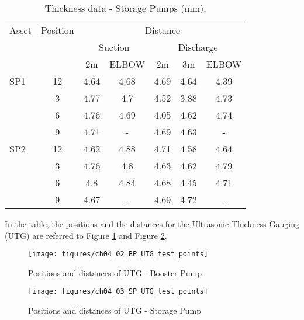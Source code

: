 \begin{table}[h]
	\caption{Thickness data - Storage Pumps (mm).}
	\label{ch04_tbl_thickness03}
	{\footnotesize
\begin{tabular}{l|c|c|c|c|l|l}
	\hline
	Asset & Position & \multicolumn{5}{c}{Distance} \\ 
	\cline{3-7}
	&  & \multicolumn{2}{c|}{Suction} & \multicolumn{3}{c}{Discharge} \\ 
	\cline{3-7}
	&  & 2m & ELBOW & 2m & \multicolumn{1}{c|}{3m} & \multicolumn{1}{c}{ELBOW} \\ 
	\hline
	SP1 & 12 & 4.64 & 4.68 & 4.69 & \multicolumn{1}{c|}{4.64} & \multicolumn{1}{c}{4.39} \\ 
	& 3 & 4.77 & 4.7 & 4.52 & \multicolumn{1}{c|}{3.88} & \multicolumn{1}{c}{4.73} \\ 
	& 6 & 4.76 & 4.69 & 4.05 & \multicolumn{1}{c|}{4.62} & \multicolumn{1}{c}{4.74} \\ 
	& 9 & 4.71 & - & 4.69 & \multicolumn{1}{c|}{4.63} & \multicolumn{1}{c}{-} \\ 
	\hline
	SP2 & 12 & 4.62 & 4.88 & 4.71 & \multicolumn{1}{c|}{4.58} & \multicolumn{1}{c}{4.64} \\ 
	& 3 & 4.76 & 4.8 & 4.63 & \multicolumn{1}{c|}{4.62} & \multicolumn{1}{c}{4.79} \\ 
	& 6 & 4.8 & 4.84 & 4.68 & \multicolumn{1}{c|}{4.45} & \multicolumn{1}{c}{4.71} \\ 
	& 9 & 4.67 & - & 4.69 & \multicolumn{1}{c|}{4.72} & \multicolumn{1}{c}{-} \\ 
	\hline
\end{tabular}


	}
\end{table}

In the table, the positions and the distances for the Ultrasonic Thickness Gauging (UTG) are referred to Figure \ref{ch04_fig_utgbp} and Figure \ref{ch04_fig_utgsp}.

\begin{figure}[!htb]
	\texttt{[image: figures/ch04\_02\_BP\_UTG\_test\_points]} \\
	\caption{Positions and distances of UTG - Booster Pump}
	\label{ch04_fig_utgbp} 
\end{figure}

\begin{figure}[!htb]
	\texttt{[image: figures/ch04\_03\_SP\_UTG\_test\_points]} \\
	\caption{Positions and distances of UTG - Storage Pump}
	\label{ch04_fig_utgsp} 
\end{figure}


